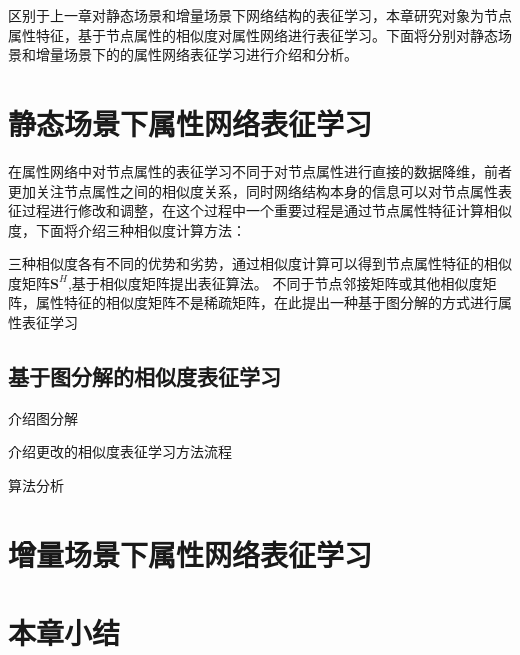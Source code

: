区别于上一章对静态场景和增量场景下网络结构的表征学习，本章研究对象为节点属性特征，基于节点属性的相似度对属性网络进行表征学习。下面将分别对静态场景和增量场景下的的属性网络表征学习进行介绍和分析。

\section{静态场景下属性网络表征学习}
在属性网络中对节点属性的表征学习不同于对节点属性进行直接的数据降维，前者更加关注节点属性之间的相似度关系，同时网络结构本身的信息可以对节点属性表征过程进行修改和调整，在这个过程中一个重要过程是通过节点属性特征计算相似度，下面将介绍三种相似度计算方法：

三种相似度各有不同的优势和劣势，通过相似度计算可以得到节点属性特征的相似度矩阵$\textbf{S}^H$,基于相似度矩阵提出表征算法。
不同于节点邻接矩阵或其他相似度矩阵，属性特征的相似度矩阵不是稀疏矩阵，在此提出一种基于图分解的方式进行属性表征学习
\subsection{基于图分解的相似度表征学习}
介绍图分解

介绍更改的相似度表征学习方法流程

算法分析

\section{增量场景下属性网络表征学习}
\section{本章小结}
